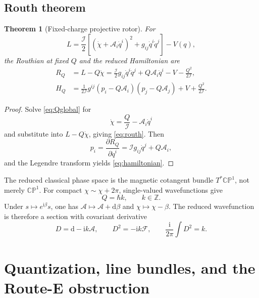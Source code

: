 \documentclass[11pt]{article}
\numberwithin{equation}{section}
\newcommand{\CP}{\mathbb{CP}}
\newcommand{\ZZ}{\mathbb Z}
\newcommand{\cI}{\mathcal I}
\newcommand{\dd}{\mathrm d}
\newcommand{\ii}{\mathrm i}
\newtheorem{theorem}{Theorem}[section]
\begin{document}
\subsection{Routh theorem}

\begin{theorem}[Fixed-charge projective rotor]
For
\begin{equation}
 L=\frac{\cI}{2}\left[(\dot\chi+\mathcal A_i\dot q^i)^2
 +g_{ij}\dot q^i\dot q^j\right]-V(q),
\end{equation}
the Routhian at fixed \(Q\) and the reduced Hamiltonian are
\begin{align}
 R_Q&=L-Q\dot\chi
 =\frac{\cI}{2}g_{ij}\dot q^i\dot q^j
 +Q\mathcal A_i\dot q^i-V-\frac{Q^2}{2\cI},
 \label{eq:routh}\\
 H_Q&=\frac{1}{2\cI}g^{ij}
 (p_i-Q\mathcal A_i)(p_j-Q\mathcal A_j)
 +V+\frac{Q^2}{2\cI}.
 \label{eq:hamiltonian}
\end{align}
\end{theorem}

\begin{proof}
Solve \eqref{eq:Qglobal} for
\begin{equation}
 \dot\chi=\frac{Q}{\cI}-\mathcal A_i\dot q^i
\end{equation}
and substitute into \(L-Q\dot\chi\), giving \eqref{eq:routh}.
Then
\begin{equation}
 p_i=\frac{\partial R_Q}{\partial\dot q^i}
 =\cI g_{ij}\dot q^j+Q\mathcal A_i,
\end{equation}
and the Legendre transform yields \eqref{eq:hamiltonian}.
\end{proof}

The reduced classical phase space is the magnetic cotangent bundle
\(T^*\CP^1\), not merely \(\CP^1\).  For compact \(\chi\sim\chi+2\pi\),
single-valued wavefunctions give
\begin{equation}
 Q=\hbar k,
 \qquad k\in\ZZ.
 \label{eq:chargequantization}
\end{equation}
Under \(s\mapsto e^{\ii\beta}s\), one has
\(\mathcal A\mapsto\mathcal A+\dd\beta\) and
\(\chi\mapsto\chi-\beta\).  The reduced wavefunction is therefore a section
with covariant derivative
\begin{equation}
 D=\dd-\ii k\mathcal A,
 \qquad D^2=-\ii k\mathcal F,
 \qquad \frac{\ii}{2\pi}\int D^2=k.
 \label{eq:lineconnection}
\end{equation}

\section{Quantization, line bundles, and the Route-E obstruction}
\end{document}

